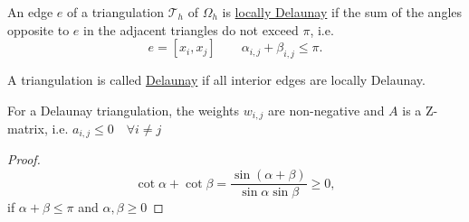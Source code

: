 \begin{definition}
\label{thm:locallydelaunay}
	An edge $e$ of a triangulation $\mathcal{T}_{h}$ of $\Omega _{h}$ is \underline{locally Delaunay} if the sum of the angles opposite to $e$ in the adjacent triangles do not exceed $\pi $, i.e.
	\[
		e = [x_{i}, x_{j}] \qquad \alpha_{i,j} + \beta_{i,j} \leq \pi 
	.\] 
\end{definition}

\begin{definition}
\label{thm:delaunay}
	A triangulation is called \underline{Delaunay} if all interior edges are locally Delaunay.
\end{definition}

\begin{lemma}
\label{thm:delaunaylemma}
	For a Delaunay triangulation, the weights $w_{i,j}$ are non-negative and $A$ is a Z-matrix, i.e. $a_{i,j} \leq 0 \quad \forall i \neq j$
\end{lemma}

\begin{proof}
\label{thm:delaunaylemmaproof}
	\[
		\cot \alpha + \cot \beta = \frac{\sin(\alpha+\beta)}{\sin \alpha \sin \beta} \geq 0
	,\] 	
	if $\alpha + \beta \leq \pi $ and $\alpha,\beta \geq 0 $
\end{proof}

